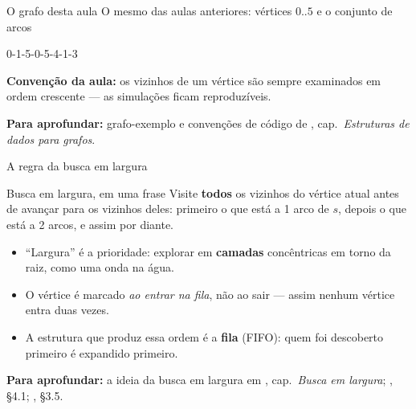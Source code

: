 \documentclass[aspectratio=169]{beamer}
\newcommand{\fonte}[1]{%
  \vfill
  {\tiny\color{gray!55!black}\textbf{Para aprofundar:} #1\par}%
}
\begin{document}
\begin{frame}{O grafo desta aula}
  {\small O mesmo das aulas anteriores: vértices $0..5$ e o conjunto de arcos}
  \begin{center}\ttfamily\small 0-1-5-0-5-4-1-3\end{center}
  \begin{center}
  \end{center}
  {\scriptsize \textbf{Convenção da aula:} os vizinhos de um vértice são sempre
  examinados em ordem crescente --- as simulações ficam reproduzíveis.}
  \fonte{grafo-exemplo e convenções de código de \cite{feofiloff2020algoritmos}, cap.\ \emph{Estruturas de dados para grafos}.}
\end{frame}

\begin{frame}{A regra da busca em largura}
  \begin{block}{Busca em largura, em uma frase}
    {\small Visite \textbf{todos} os vizinhos do vértice atual antes de avançar
    para os vizinhos deles: primeiro o que está a 1 arco de $s$, depois o que
    está a 2 arcos, e assim por diante.}
  \end{block}
  \medskip
  {\small
  \begin{itemize}\small
    \item ``Largura'' é a prioridade: explorar em \textbf{camadas} concêntricas
          em torno da raiz, como uma onda na água.
    \item O vértice é marcado \emph{ao entrar na fila}, não ao sair --- assim
          nenhum vértice entra duas vezes.
    \item A estrutura que produz essa ordem é a \textbf{fila} (FIFO):
          quem foi descoberto primeiro é expandido primeiro.
  \end{itemize}}
  \fonte{a ideia da busca em largura em \cite{feofiloff2020algoritmos}, cap.\ \emph{Busca em largura};
  \cite{sedgewick2011algorithms}, §4.1; \cite{levitin2012introduction}, §3.5.}
\end{frame}
\end{document}
